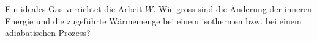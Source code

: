 Ein ideales Gas verrichtet die Arbeit $W$. Wie gross sind die Änderung der inneren Energie und die zugeführte Wärmemenge bei einem isothermen bzw. bei einem adiabatischen Prozess?
